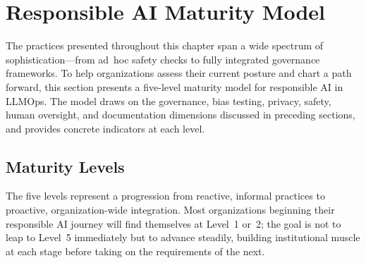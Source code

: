 \section{Responsible AI Maturity Model}\label{sec:ethics-maturity}

The practices presented throughout this chapter span a wide spectrum of sophistication---from ad~hoc safety checks to fully integrated governance frameworks. To help organizations assess their current posture and chart a path forward, this section presents a five-level maturity model for responsible AI in LLMOps. The model draws on the governance, bias testing, privacy, safety, human oversight, and documentation dimensions discussed in preceding sections, and provides concrete indicators at each level.

\subsection{Maturity Levels}\label{sec:ch11_maturity_levels}

The five levels represent a progression from reactive, informal practices to proactive, organization-wide
integration. Most organizations beginning their responsible AI journey will find themselves at Level~1 or~2;
the goal is not to leap to Level~5 immediately but to advance steadily, building institutional muscle at each
stage before taking on the requirements of the next.

